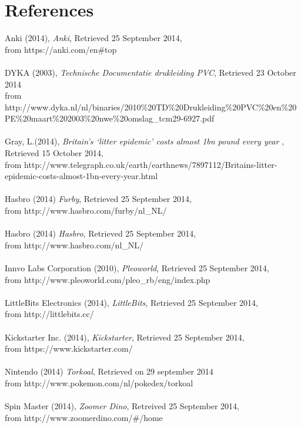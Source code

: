 \documentclass[11pt,twoside,a4paper]{report}
\begin{document}
\chapter{References}
Anki (2014), \textit{Anki}, Retrieved 25 September 2014, \\from https://anki.com/en\#top \\
\\
DYKA (2003), \textit{Technische Documentatie drukleiding PVC}, Retrieved 23 October 2014 \\
from http://www.dyka.nl/nl/binaries/2010\%20TD\%20Drukleiding\%20PVC\%20en\%20PE\%20maart\%202003\%20nwe\%20omslag\_tcm29-6927.pdf \\
\\
Gray, L.(2014), \textit{Britain\rq{}s \lq{}litter epidemic\rq{} costs almost 1bn pound every year} , Retrieved 15 October 2014, \\from http://www.telegraph.co.uk/earth/earthnews/7897112/Britains-litter-epidemic-costs-almost-1bn-every-year.html \\
\\
Hasbro (2014) \textit{Furby}, Retrieved 25 September 2014, \\from http://www.hasbro.com/furby/nl\_NL/ \\
\\
Hasbro (2014) \textit{Hasbro}, Retrieved 25 September 2014, \\from http://www.hasbro.com/nl\_NL/ \\
\\
Innvo Labs Corporation (2010), \textit{Pleoworld}, Retrieved 25 September 2014, \\from http://www.pleoworld.com/pleo\_rb/eng/index.php \\
\\
LittleBits Electronics (2014), \textit{LittleBits}, Retrieved 25 September 2014,\\ from http://littlebits.cc/ \\
\\
Kickstarter Inc. (2014), \textit{Kickstarter}, Retrieved 25 September 2014, \\from https://www.kickstarter.com/ \\
\\
Nintendo (2014) \textit{Torkoal}, Retrieved on 29 september 2014\\ from http://www.pokemon.com/nl/pokedex/torkoal \\
\\
Spin Master (2014), \textit{Zoomer Dino}, Retreived 25 September 2014, \\from http://www.zoomerdino.com/\#/home\\
\end{document}
